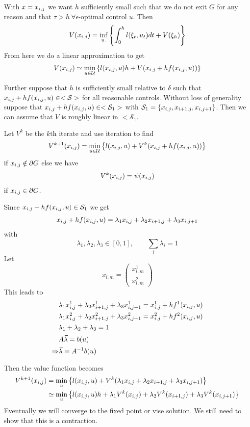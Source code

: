 With $x=x_{i,j}$ we want $h$ sufficiently small such that we do not exit $G$ for any reason and that $\tau>h ~\forall \epsilon$-optimal control $u$. Then
$$V(x_{i,j}) = \inf_{u.}\left\lbrace \int_0^h l(\xi_t,u_t)dt + V(\xi_h) \right\rbrace$$
From here we do a linear approximation to get
$$V(x_{i,j}) \simeq \min_{u\in\mathcal{U}}\left\lbrace l(x_{i,j},u)h + V(x_{i,j} + hf(x_{i,j},u)) \right\rbrace$$

Further suppose that $h$ is sufficiently small relative to $\delta$ such that $x_{i,j}+hf(x_{i,j},u)\in<\mathcal{S}>$ for all reasonable controls. Without loss of generality suppose that $x_{i,j}+hf(x_{i,j},u)\in<\mathcal{S}_1>$ with $\mathcal{S}_1=\{x_{i,j},x_{i+1,j},x_{i,j+1}\}$. Then we can assume that $V$ is roughly linear in $<\mathcal{S}_1$.

Let $V^k$ be the $k$th iterate and use iteration to find
$$V^{k+1}(x_{i,j}) = \min_{u\in\mathcal{U}}\left\lbrace l(x_{i,j},u) + V^k(x_{i,j}+hf(x_{i,j},u))\right\rbrace$$
if $x_{i,j}\notin\partial G$ else we have
$$V^k(x_{i,j})=\psi(x_{i,j})$$
if $x_{i,j}\in\partial G$.

Since $x_{i,j}+hf(x_{i,j},u)\in\mathcal{S}_1$ we get
$$x_{i,j}+hf(x_{i,j},u) = \lambda_1x_{i,j} + \lambda_2x_{i+1,j} + \lambda_3x_{i,j+1}$$
with
$$\lambda_1,\lambda_2,\lambda_3\in[0,1], \qquad \sum_i\lambda_i=1$$
Let
$$x_{l,m} = \left(\begin{array}{c} x_{l,m}^1 \\ x_{l,m}^2 \end{array}\right)$$
This leads to
\begin{align*}
&\lambda_1x_{i,j}^1 + \lambda_2x_{i+1,j}^1 + \lambda_3x_{i,j+1}^1 = x_{i,j}^1+hf^1(x_{i,j},u) \\
&\lambda_1x_{i,j}^2 + \lambda_2x_{i+1,j}^2 + \lambda_3x_{i,j+1}^2 = x_{i,j}^2+hf^2(x_{i,j},u) \\
&\lambda_1 + \lambda_2 + \lambda_3 = 1 \\
&A\vec{\lambda} = b(u) \\
\Rightarrow &\vec{\lambda} = A^{-1}b(u)
\end{align*}

Then the value function becomes
\begin{align}
\label{eq:17val}
V^{k+1}(x_{i,j}) &= \min_u\left\lbrace l(x_{i,j},u) + V^k(\lambda_1x_{i,j} + \lambda_2x_{i+1,j} + \lambda_3x_{i,j+1}) \right\rbrace \nonumber \\
&\simeq \min_u\left\lbrace l(x_{i,j},u)h + \lambda_1V^k(x_{i,j}) + \lambda_2V^k(x_{i+1,j}) + \lambda_3V^k(x_{i,j+1}) \right\rbrace
\end{align}
Eventually we will converge to the fixed point or vise solution. We still need to show that this is a contraction.

